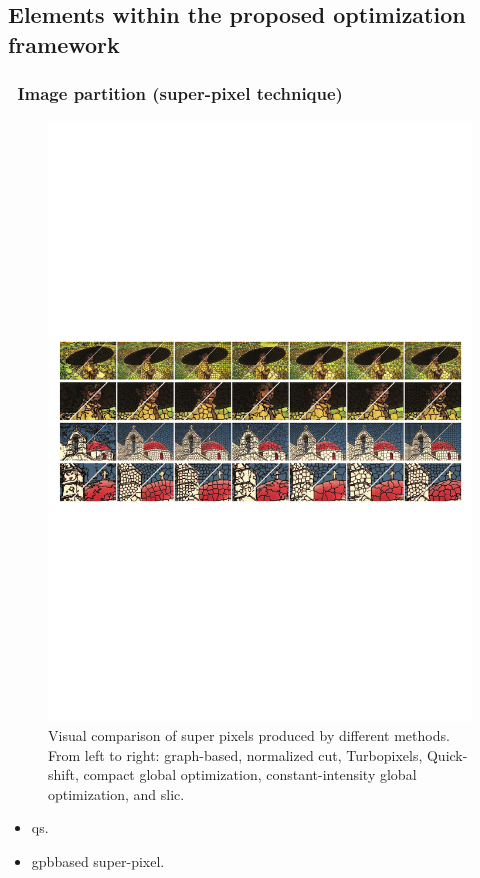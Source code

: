 \subsection{Elements within the proposed optimization framework}
\begin{frame}\frametitle{~Image partition (super-pixel technique)} 
\begin{figure}[htbp]
\centering
\includegraphics[trim=0 0 0 120, clip, width=1\textwidth]{spixelsReview}
\caption{{\tiny
Visual comparison of super pixels produced by different methods\footnotemark[1]. From left to right: 
graph-based,
normalized cut,
Turbopixels,
Quick-shift,
compact global optimization,
constant-intensity global optimization,
and \acs{slic}.}}
\end{figure}
\vspace{-15pt}
\begin{itemize}
\item  \acf{qs}\footnotemark[2].
\item \acf{gpb}\footnotemark[3] based super-pixel. %
\end{itemize}
\vspace{5pt}


\end{frame}
